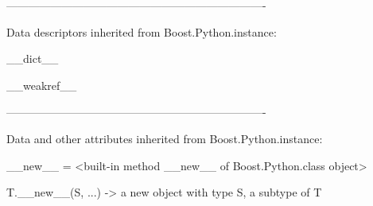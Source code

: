 \documentclass[letterpaper,10pt,english]{sphinxmanual}
\begin{document}
\begin{description}
\begin{description}
\begin{DUlineblock}{0em}
\item[] ----------------------------------------------------------------------
\item[] Data descriptors inherited from Boost.Python.instance:
\item[] 
\item[] \_\_dict\_\_
\item[] 
\item[] \_\_weakref\_\_
\item[] 
\item[] ----------------------------------------------------------------------
\item[] Data and other attributes inherited from Boost.Python.instance:
\item[] 
\item[] \_\_new\_\_ = \textless{}built-in method \_\_new\_\_ of Boost.Python.class object\textgreater{}
\item[]
\begin{DUlineblock}{\DUlineblockindent}
\item[] T.\_\_new\_\_(S, ...) -\textgreater{} a new object with type S, a subtype of T
\end{DUlineblock}
\end{DUlineblock}


\end{description}
\end{description}
\end{document}
